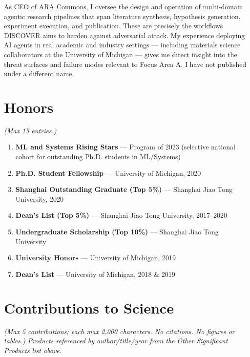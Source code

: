 \documentclass[10pt]{article}
\begin{document}
As CEO of ARA Commons, I oversee the design and operation of multi-domain agentic research pipelines that span literature synthesis, hypothesis generation, experiment execution, and publication. These are precisely the workflows DISCOVER aims to harden against adversarial attack. My experience deploying AI agents in real academic and industry settings — including materials science collaborators at the University of Michigan — gives me direct insight into the threat surfaces and failure modes relevant to Focus Area A. I have not published under a different name.

\section*{Honors}
\textit{(Max 15 entries.)}

\vspace{4pt}
\begin{enumerate}[noitemsep, topsep=2pt, leftmargin=1.5em, label=\arabic*.]
  \item \textbf{ML and Systems Rising Stars} — Program of 2023 (selective national cohort for outstanding Ph.D. students in ML/Systems)
  \item \textbf{Ph.D. Student Fellowship} — University of Michigan, 2020
  \item \textbf{Shanghai Outstanding Graduate (Top 5\%)} — Shanghai Jiao Tong University, 2020
  \item \textbf{Dean's List (Top 5\%)} — Shanghai Jiao Tong University, 2017--2020
  \item \textbf{Undergraduate Scholarship (Top 10\%)} — Shanghai Jiao Tong University
  \item \textbf{University Honors} — University of Michigan, 2019
  \item \textbf{Dean's List} — University of Michigan, 2018 \& 2019
\end{enumerate}

\section*{Contributions to Science}
\textit{(Max 5 contributions; each max 2,000 characters. No citations. No figures or tables.)}
\textit{Products referenced by author/title/year from the Other Significant Products list above.}

\vspace{4pt}
\end{document}
